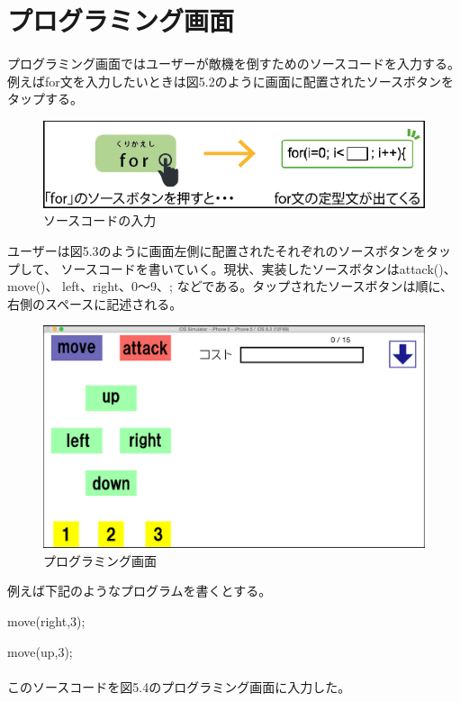 \documentclass[openany,11pt,papersize]{jsbook}
\begin{document}

\section{プログラミング画面}
プログラミング画面ではユーザーが敵機を倒すためのソースコードを入力する。
例えばfor文を入力したいときは図5.2のように画面に配置されたソースボタンをタップする。

\begin{figure}[H]
\begin{center}
\includegraphics[width=12cm, bb=0 0 564 129]{img/5thParagraph/forButton.png}
\end{center}
\caption{ソースコードの入力}
\end{figure}
ユーザーは図5.3のように画面左側に配置されたそれぞれのソースボタンをタップして、
ソースコードを書いていく。現状、実装したソースボタンはattack()、move()、
left、right、0〜9、;  などである。タップされたソースボタンは順に、右側のスペースに記述される。


\begin{figure}[H]
\begin{center}
\includegraphics[width=12cm, bb=0 0 1136 662]{img/5thParagraph/Prog-ra_programming.png}
\end{center}
\caption{プログラミング画面}
\end{figure}

例えば下記のようなプログラムを書くとする。
\par move(right,3);
\par move(up,3);
\\
\\
このソースコードを図5.4のプログラミング画面に入力した。
\end{document}
